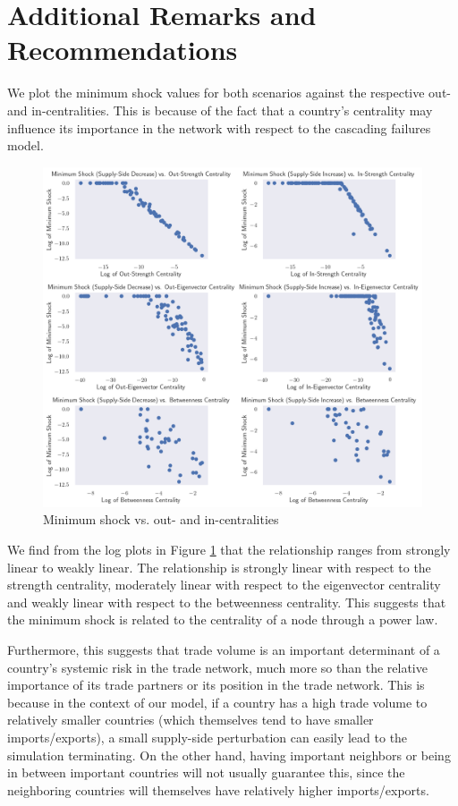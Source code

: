 \documentclass[12pt,letterpaper]{report}
\begin{document}
	\section{Additional Remarks and Recommendations}
	\label{sec:55additionalRemarks}
	
	We plot the minimum shock values for both scenarios against the respective out- and in-centralities. This is because of the fact that a country's centrality may influence its importance 
	in the network with respect to the cascading failures model.
	
	\begin{figure}[!h]
		\centering
		\includegraphics[width=\textwidth]{Fig524-ShockvsCentrality.png}
		\caption{Minimum shock vs. out- and in-centralities}\label{fig:523ShockvsCentrality}
	\end{figure}

	We find from the log plots in Figure \ref{fig:523ShockvsCentrality} that the relationship ranges from strongly linear to weakly linear. The relationship is strongly linear with respect to the strength centrality, moderately linear with respect to the eigenvector centrality and weakly linear with respect to the betweenness centrality. This suggests that the minimum shock is related to the centrality of a node through a power law.
	
	Furthermore, this suggests that trade volume is an important determinant of a country's systemic risk in the trade network, much more so than the relative importance of its trade partners or its position in the trade network. This is because in the context of our model, if a country has a high trade volume to relatively smaller countries (which themselves tend to have smaller imports/exports), a small supply-side perturbation can easily lead to the simulation terminating. On the other hand, having important neighbors or being in between important countries will not usually guarantee this, since the neighboring countries will themselves have relatively higher imports/exports. 
	
\end{document}
